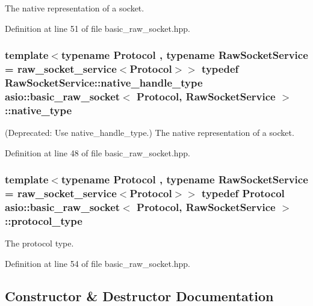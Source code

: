 The native representation of a socket. 



Definition at line 51 of file basic\+\_\+raw\+\_\+socket.\+hpp.

\hypertarget{classasio_1_1basic__raw__socket_aef7c77cd3736fffd674702695c63287c}{}
\subsubsection[{native\+\_\+type}]{\setlength{\rightskip}{0pt plus 5cm}template$<$typename Protocol , typename Raw\+Socket\+Service  = raw\+\_\+socket\+\_\+service$<$\+Protocol$>$$>$ typedef Raw\+Socket\+Service\+::native\+\_\+handle\+\_\+type {\bf asio\+::basic\+\_\+raw\+\_\+socket}$<$ Protocol, Raw\+Socket\+Service $>$\+::{\bf native\+\_\+type}}\label{classasio_1_1basic__raw__socket_aef7c77cd3736fffd674702695c63287c}
(Deprecated\+: Use native\+\_\+handle\+\_\+type.) The native representation of a socket. 

Definition at line 48 of file basic\+\_\+raw\+\_\+socket.\+hpp.

\hypertarget{classasio_1_1basic__raw__socket_aa7e790d1b35972ac2c4d1d5999b94d93}{}
\subsubsection[{protocol\+\_\+type}]{\setlength{\rightskip}{0pt plus 5cm}template$<$typename Protocol , typename Raw\+Socket\+Service  = raw\+\_\+socket\+\_\+service$<$\+Protocol$>$$>$ typedef Protocol {\bf asio\+::basic\+\_\+raw\+\_\+socket}$<$ Protocol, Raw\+Socket\+Service $>$\+::{\bf protocol\+\_\+type}}\label{classasio_1_1basic__raw__socket_aa7e790d1b35972ac2c4d1d5999b94d93}


The protocol type. 



Definition at line 54 of file basic\+\_\+raw\+\_\+socket.\+hpp.



\subsection{Constructor \& Destructor Documentation}
\hypertarget{classasio_1_1basic__raw__socket_ae2c344d0aa64b6cdafc8e39764a5c5ed}{}
